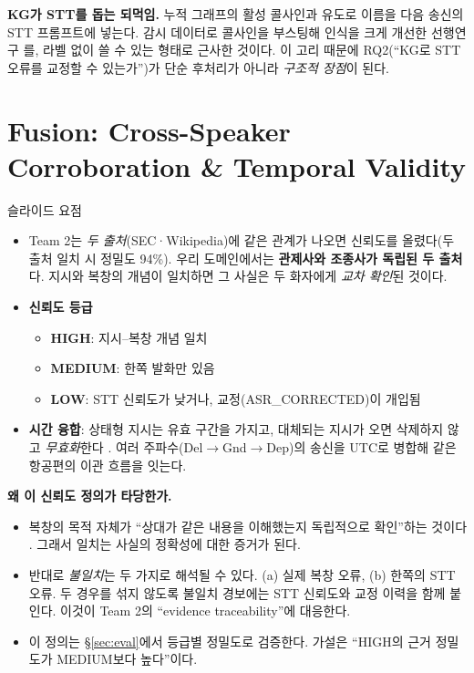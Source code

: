 \documentclass[10pt,a4paper]{article}
\newcommand{\cmd}[1]{\textsf{\small #1}}
\begin{document}
\begin{addbox}
\textbf{KG가 STT를 돕는 되먹임.} 누적 그래프의 활성 콜사인과 유도로 이름을 다음 송신의 STT 프롬프트에 넣는다. 감시 데이터로 콜사인을 부스팅해 인식을 크게 개선한 선행연구 \cite{nigmatulina2022}를, 라벨 없이 쓸 수 있는 형태로 근사한 것이다. 이 고리 때문에 RQ2(``KG로 STT 오류를 교정할 수 있는가'')가 단순 후처리가 아니라 \emph{구조적 장점}이 된다.
\end{addbox}

\section{Fusion: Cross-Speaker Corroboration \& Temporal Validity}\label{sec:fusion}
\begin{keybox}{슬라이드 요점}
\begin{itemize}[leftmargin=12pt]
\item Team 2는 \emph{두 출처}(SEC·Wikipedia)에 같은 관계가 나오면 신뢰도를 올렸다(두 출처 일치 시 정밀도 94\%). 우리 도메인에서는 \textbf{관제사와 조종사가 독립된 두 출처}다. 지시와 복창의 개념이 일치하면 그 사실은 두 화자에게 \emph{교차 확인}된 것이다.
\item \textbf{신뢰도 등급}
  \begin{itemize}
  \item \textbf{HIGH}: 지시--복창 개념 일치
  \item \textbf{MEDIUM}: 한쪽 발화만 있음
  \item \textbf{LOW}: STT 신뢰도가 낮거나, 교정(\cmd{ASR\_CORRECTED})이 개입됨
  \end{itemize}
\item \textbf{시간 융합}: 상태형 지시는 유효 구간을 가지고, 대체되는 지시가 오면 삭제하지 않고 \emph{무효화}한다 \cite{zep2025}. 여러 주파수(Del$\to$Gnd$\to$Dep)의 송신을 UTC로 병합해 같은 항공편의 이관 흐름을 잇는다.
\end{itemize}
\end{keybox}

\begin{addbox}
\textbf{왜 이 신뢰도 정의가 타당한가.}
\begin{itemize}[leftmargin=12pt]
\item 복창의 목적 자체가 ``상대가 같은 내용을 이해했는지 독립적으로 확인''하는 것이다 \cite{faa7110}. 그래서 일치는 사실의 정확성에 대한 증거가 된다.
\item 반대로 \emph{불일치}는 두 가지로 해석될 수 있다. (a) 실제 복창 오류, (b) 한쪽의 STT 오류. 두 경우를 섞지 않도록 불일치 경보에는 STT 신뢰도와 교정 이력을 함께 붙인다. 이것이 Team 2의 ``evidence traceability''에 대응한다.
\item 이 정의는 \S\ref{sec:eval}에서 등급별 정밀도로 검증한다. 가설은 ``HIGH의 근거 정밀도가 MEDIUM보다 높다''이다.
\end{itemize}
\end{addbox}
\end{document}
